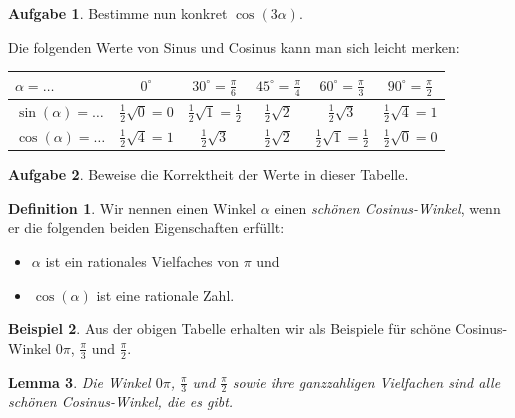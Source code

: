 \documentclass[a4paper,ngerman,12pt]{scrartcl}
\theoremstyle{definition}
\newtheorem{defn}{Definition}[]
\newtheorem{bsp}[defn]{Beispiel}
\newtheorem{aufg}{Aufgabe}
\theoremstyle{plain}
\newtheorem{lemma}[defn]{Lemma}
\theoremstyle{remark}
\begin{document}
\begin{aufg}
	Bestimme nun konkret $\cos(3\alpha)$. 
\end{aufg}

Die folgenden Werte von Sinus und Cosinus kann man sich leicht merken:
\begin{center}\renewcommand{\arraystretch}{1.5}
	\begin{tabular}{l|c|c|c|c|c}
		$\alpha=\dots$ & $0^\circ$ & $30^\circ = \tfrac{\pi}{6}$  & $45^\circ = \tfrac{\pi}{4}$ & $60^\circ = \tfrac{\pi}{3}$ & $90^\circ = \tfrac{\pi}{2}$ \\\hline\hline
		$\sin(\alpha)=\dots$ & $\tfrac{1}{2}\sqrt{0}=0$ & $\tfrac{1}{2}\sqrt{1}=\tfrac{1}{2}$ & $\tfrac{1}{2}\sqrt{2}$ & $\tfrac{1}{2}\sqrt{3}$ & $\tfrac{1}{2}\sqrt{4}=1$ \\\hline
		$\cos(\alpha)=\dots$ & $\tfrac{1}{2}\sqrt{4}=1$ & $\tfrac{1}{2}\sqrt{3}$ & $\tfrac{1}{2}\sqrt{2}$ & $\tfrac{1}{2}\sqrt{1}=\tfrac{1}{2}$ & $\tfrac{1}{2}\sqrt{0}=0$ 
	\end{tabular}
\end{center}

\begin{aufg}
	Beweise die Korrektheit der Werte in dieser Tabelle.
\end{aufg}

\begin{defn}
	Wir nennen einen Winkel $\alpha$ einen \emph{schönen Cosinus-Winkel}, wenn er die folgenden beiden Eigenschaften erfüllt:
	\begin{itemize}
		\item $\alpha$ ist ein rationales Vielfaches von $\pi$ und
		\item $\cos(\alpha)$ ist eine rationale Zahl.
	\end{itemize}
\end{defn}

\begin{bsp}
	Aus der obigen Tabelle erhalten wir als Beispiele für schöne Cosinus-Winkel $0\pi$, $\tfrac{\pi}{3}$ und $\tfrac{\pi}{2}$.
\end{bsp}

\begin{lemma}\label{lemma:AlleSchoenenCosinusWinkel}
	Die Winkel $0\pi$, $\tfrac{\pi}{3}$ und $\tfrac{\pi}{2}$ sowie ihre ganzzahligen Vielfachen sind alle schönen Cosinus-Winkel, die es gibt.
\end{lemma}
\end{document}
